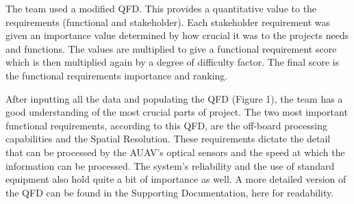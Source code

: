 \begin{fullwidth}
    The team used a modified QFD. This provides a quantitative value to the requirements (functional and stakeholder). Each stakeholder requirement was given an importance value determined by how crucial it was to the projects needs and functions. The values are multiplied to give a functional requirement score which is then multiplied again by a degree of difficulty factor. The final score is the functional requirements importance and ranking.

    After inputting all the data and populating the QFD (Figure 1), the team has a good understanding of the most crucial parts of project. The two most important functional requirements, according to this QFD, are the off-board processing capabilities and the Spatial Resolution. These requirements dictate the detail that can be processed by the AUAV’s optical sensors and the speed at which the information can be processed. The system’s reliability and the use of standard equipment also hold quite a bit of importance as well. A more detailed version of the QFD can be found in the Supporting Documentation, here for readability.

\end{fullwidth}
